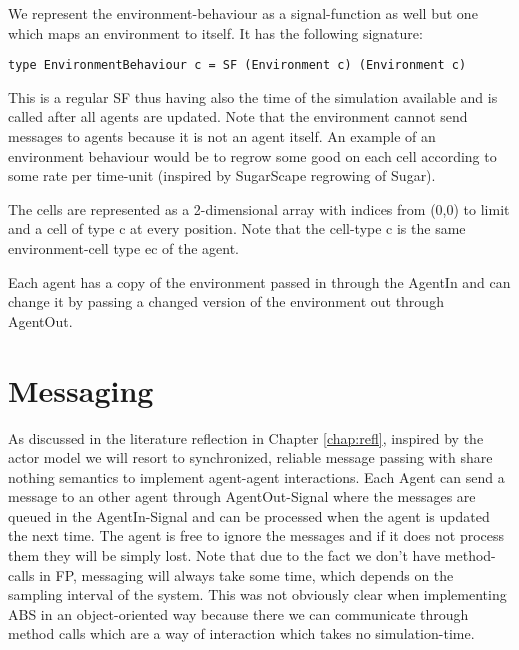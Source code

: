 We represent the environment-behaviour as a signal-function as well but one which maps an environment to itself. It has the following signature:
\begin{lstlisting}[]
type EnvironmentBehaviour c = SF (Environment c) (Environment c)
\end{lstlisting}
This is a regular SF thus having also the time of the simulation available and is called after all agents are updated. Note that the environment cannot send messages to agents because it is not an agent itself. An example of an environment behaviour would be to regrow some good on each cell according to some rate per time-unit (inspired by SugarScape regrowing of Sugar).

The cells are represented as a 2-dimensional array with indices from (0,0) to limit and a cell of type c at every position. Note that the cell-type c is the same environment-cell type ec of the agent.

Each agent has a copy of the environment passed in through the AgentIn and can change it by passing a changed version of the environment out through AgentOut.

\section{Messaging}
As discussed in the literature reflection in Chapter \ref{chap:refl}, inspired by the actor model we will resort to synchronized, reliable message passing with share nothing semantics to implement agent-agent interactions. Each Agent can send a message to an other agent through AgentOut-Signal where the messages are queued in the AgentIn-Signal and can be processed when the agent is updated the next time. The agent is free to ignore the messages and if it does not process them they will be simply lost.
Note that due to the fact we don't have method-calls in FP, messaging will always take some time, which depends on the sampling interval of the system. This was not obviously clear when implementing ABS in an object-oriented way because there we can communicate through method calls which are a way of interaction which takes no simulation-time.



